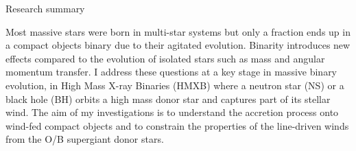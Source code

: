 \documentclass[letterpaper,12pt,onecolumn]{article}
\makeatletter
\newcommand*{\hmxb}{HMXB\@\xspace}
\newcommand*{\ns}{NS\@\xspace}
\newcommand*{\bh}{BH\@\xspace}
\makeatother
\begin{document}


\thispagestyle{empty}

\begin{center}
\vspace*{-1.2cm}
\Large Research summary
\end{center}
\normalfont

\vspace*{0.7cm}



%

Most massive stars were born in multi-star systems but only a fraction ends up in a compact objects binary due to their agitated evolution. Binarity introduces new effects compared to the evolution of isolated stars such as mass and angular momentum transfer. I address these questions at a key stage in massive binary evolution, in High Mass X-ray Binaries (\hmxb) where a neutron star (\ns) or a black hole (\bh) orbits a high mass donor star and captures part of its stellar wind. The aim of my investigations is to understand the accretion process onto wind-fed compact objects and to constrain the properties of the line-driven winds from the O/B supergiant donor stars.
\end{document}
